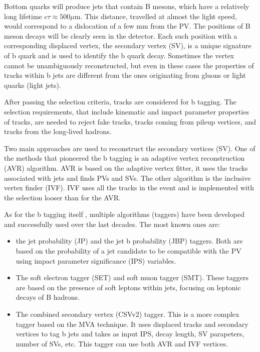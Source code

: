 Bottom quarks will produce jets that contain B mesons, which have a relatively long lifetime $c \tau \approx 500 \mu$m. This distance, travelled at almost the light speed, would correspond to a dislocation of a few mm from the PV. The positions of B meson decays will be clearly seen in the detector. Each such position with a corresponding displaced vertex, the secondary vertex (SV), is a unique signature of b quark and is used to identify the b quark decay. Sometimes the vertex cannot be unambiguously reconstructed, but even in these cases the properties of tracks within b jets are different from the ones originating from gluons or light quarks (light jets).

After passing the selection criteria, tracks are considered for b tagging. The selection requirements, that include kinematic and impact parameter properties of tracks, are needed to reject fake tracks, tracks coming from pileup vertices, and tracks from the long-lived hadrons. 

Two main approaches are used to reconstruct the secondary vertices (SV). One of the methods that pioneered the b tagging is an adaptive vertex reconstruction (AVR) algorithm. AVR is based on the adaptive vertex fitter, it uses the tracks associated with jets and finds PVs and SVs. The other algorithm is the inclusive vertex finder (IVF). IVF uses all the tracks in the event and is implemented with the selection looser than for the AVR. 

As for the b tagging itself \cite{CMS-PAS-BTV-15-001, Sirunyan:2017ezt}, multiple algorithms (taggers) have been developed and successfully used over the last decades. The most known ones are: 

\begin{itemize}
\item the jet probability (JP) and the jet b probability (JBP) taggers. Both are based on the probability of a jet candidate to be compatible with the PV using impact parameter significance (IPS) variables.
\item The soft electron tagger (SET) and soft muon tagger (SMT). These taggers are based on the presence of soft leptons within jets, focusing on leptonic decays of B hadrons.
\item The combined secondary vertex (CSVv2) tagger. This is a more complex tagger based on the MVA technique. It uses displaced tracks and secondary vertices to tag b jets and takes as input IPS, decay length, SV parapeters, number of SVs, etc. This tagger can use both AVR and IVF vertices.
\end{itemize}


